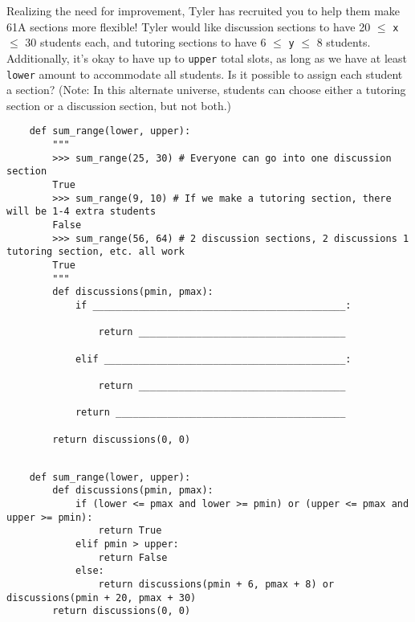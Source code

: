 \begin{blocksection}
    \question Realizing the need for improvement, Tyler has recruited you to help them make 61A sections more flexible! 
    Tyler would like discussion sections to have 20 $\leq$ \lstinline$x$ $\leq$ 30 students each, 
    and tutoring sections to have 6 $\leq$ \lstinline$y$ $\leq$ 8 students. 
    Additionally, it's okay to have up to \lstinline$upper$ total slots, as long as we have at least \lstinline$lower$ amount to accommodate all students.
    Is it possible to assign each student a section? (Note: In this alternate universe, students can choose either
    a tutoring section or a discussion section, but not both.)
    
    \begin{lstlisting}
    def sum_range(lower, upper):
        """
        >>> sum_range(25, 30) # Everyone can go into one discussion section
        True
        >>> sum_range(9, 10) # If we make a tutoring section, there will be 1-4 extra students
        False
        >>> sum_range(56, 64) # 2 discussion sections, 2 discussions 1 tutoring section, etc. all work
        True
        """
        def discussions(pmin, pmax):
            if ____________________________________________:
    
                return ____________________________________
    
            elif __________________________________________:
    
                return ____________________________________
    
            return ________________________________________
    
        return discussions(0, 0)
    
    \end{lstlisting}
    \end{blocksection}
    
    \begin{solution}[1.5in]
    \begin{blocksection}
    \begin{lstlisting}
    def sum_range(lower, upper):
        def discussions(pmin, pmax):
            if (lower <= pmax and lower >= pmin) or (upper <= pmax and upper >= pmin):
                return True
            elif pmin > upper:
                return False
            else:
                return discussions(pmin + 6, pmax + 8) or discussions(pmin + 20, pmax + 30)
        return discussions(0, 0)
    \end{lstlisting}
    
    \end{blocksection}
    \end{solution}
    
